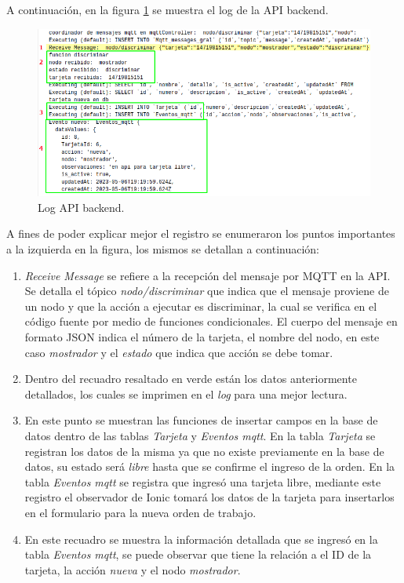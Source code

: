 A continuación, en la figura \ref{fig:ensayo-nueva-logs} se muestra el log de la API backend. 

\begin{figure}[H]
	\centering
	\includegraphics[scale=.66]{./Figures/ensayo-1/6.nueva-logs-1.png}
	\caption{Log API backend.}
	\label{fig:ensayo-nueva-logs}
\end{figure}

A fines de poder explicar mejor el registro se enumeraron los puntos importantes a la izquierda en la figura, los mismos se detallan a continuación:

\begin{enumerate}
\item \textit{Receive Message} se refiere a la recepción del mensaje por MQTT en la API. Se detalla el tópico \textit{nodo/discriminar} que indica que el mensaje proviene de un nodo y que la acción a ejecutar es discriminar, la cual se verifica en el código fuente por medio de funciones condicionales. El cuerpo del mensaje en formato JSON indica  el número de la tarjeta, el nombre del nodo, en este caso \textit{mostrador} y el \textit{estado} que indica que acción se debe tomar.

\item Dentro del recuadro resaltado en verde están los datos anteriormente detallados, los cuales se imprimen en el \textit{log} para una mejor lectura.

\item En este punto se muestran las funciones de insertar campos en la base de datos dentro de las tablas \textit{Tarjeta} y \textit{Eventos mqtt}. En la tabla \textit{Tarjeta} se registran los datos de la misma ya que no existe previamente en la base de datos, su estado será \textit{libre} hasta que se confirme el ingreso de la orden. En la tabla \textit{Eventos mqtt} se registra que ingresó una tarjeta libre, mediante este registro el observador de Ionic tomará los datos de la tarjeta para insertarlos en el formulario para la nueva orden de trabajo.

\item En este recuadro se muestra la información detallada que se ingresó en la tabla \textit{Eventos mqtt}, se puede observar que tiene la relación a el ID de la tarjeta, la acción \textit{nueva} y el nodo \textit{mostrador}.
\end{enumerate}

